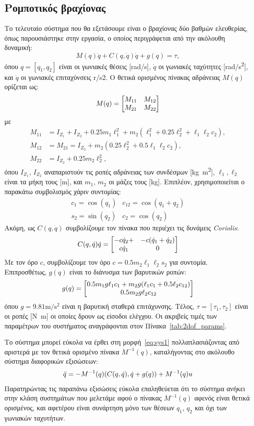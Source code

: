 \subsection{Ρομποτικός βραχίονας}
\label{exampleB}
Το τελευταίο σύστημα που θα εξετάσουμε είναι ο βραχίονας δύο βαθμών ελευθερίας, όπως παρουσιάστηκε στην εργασία\cite{bechlioulis2008robust, Theodorakopoulos2016}, ο οποίος περιγράφεται από την ακόλουθη δυναμική:
\[
M(q)\ddot q + C(q,\dot q)\dot q + g(q) = \tau,
\]
όπου $q = [q_1, q_2]$ είναι οι γωνιακές θέσεις [\si{\radian/\second}], $\dot q$ οι γωνιακές ταχύτητες [\si{\radian/\second^2}], και $\ddot q$ οι γωνιακές επιταχύνσεις  r/s2. Ο θετικά ορισμένος πίνακας αδράνειας $M(q)$ ορίζεται ως:
\[
M(q) = \bmqty{M_{11} & M_{12}\\ M_{21} & M_{22}}
\]
με
\begin{align*}
M_{11} &= I_{Z_1} + I_{Z_2} + 0.25 m_1 \ell_1^2 
+ m_2(\ell_1^2 + 0.25 \ell_2^2 + \ell_1 \ell_2 c_2),\\
M_{12} &= M_{21} = I_{Z_2} + m_2 (0.25 \ell_2^2 + 0.5 \ell_1 \ell_2 c_2),\\
M_{22} &= I_{Z_2} + 0.25 m_2 \ell_2^2,
\end{align*}
όπου $I_{Z_1}$, $I_{Z_2}$ αναπαριστούν τις ροπές αδράνειας των συνδέσμων [\si{\kilo\gram \metre^2}], $\ell_1, \ell_2$ είναι τα μήκη τους [\si{\metre}], και $m_1$, $m_2$ οι μάζες τους [\si{\kilo\gram}]. Επιπλέον, χρησιμοποιείται ο παρακάτω συμβολισμός χάριν συντομίας:
\[\begin{array}{ll}
c_1 = \cos(q_1) & c_{12} = \cos(q_1 + q_2)\\
s_2 = \sin(q_2) & c_2 = \cos(q_2)
\end{array}\]
Ακόμη, ως $C(q, \dot q)$ συμβολίζουμε τον πίνακα που περιέχει τις δυνάμεις \textit{Coriolis}:
\[
C(q, \dot q)\dot q = \bmqty{-c \dot q_2 +  & -c(\dot q_1 + \dot q_2)\\ c \dot q_1 & 0}
\]
Με τον όρο $c$, συμβολίζουμε τον όρο $c = 0.5 m_2 \ell_1 \ell_2 s_2$ για συντομία. Επιπροσθέτως, $g(q)$ είναι το διάνυσμα των βαρυτικών ροπών:
\[
g(q) = 
\bmqty{0.5 m_1 g \ell_1 c_1 + m_2 g (\ell_1 c_1 + 0.5 \ell_2 c_{12}) \\
	0.5 m_2 g \ell_2 c_{12}}  
\]
όπου $g = 9.81 \si{\metre\per\second^2}$ είναι η βαρυτική σταθερά επιτάχυνσης. Τέλος, $\tau =[\tau_1, \tau_2]$ είναι οι ροπές [\si{\newton\metre}] οι οποίες δρουν ως είσοδοι ελέγχου. Οι ακριβείς τιμές των παραμέτρων του συστήματος αναγράφονται στον Πίνακα~\ref{tab:2dof_params}. 

Το σύστημα μπορεί εύκολα να έρθει στη μορφή~\eqref{eq:sys1} πολλαπλασιάζοντας από αριστερά με τον θετικά ορισμένο πίνακα $M^{-1}(q)$, καταλήγοντας στο ακόλουθο σύστημα διαφορικών εξισώσεων:
\[
\ddot q = - M^{-1}(q) \pqty{C(q,\dot q),\dot q + g(q)} + M^{-1}(q)u 
\]
Παρατηρώντας τις παραπάνω εξισώσεις εύκολα επαληθεύεται ότι το σύστημα ανήκει στην κλάση συστημάτων που μελετάμε αφού ο πίνακας $ M^{-1}(q)$ αφενός είναι θετικά ορισμένος, και αφετέρου είναι συνάρτηση μόνο των θέσεων $q_1$, $q_2$ και όχι των γωνιακών ταχυτήτων.


